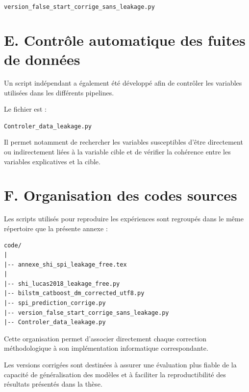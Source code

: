 \documentclass[12pt, a4paper, oneside, french]{report}
\begin{document}
\begin{center}
\texttt{version\_false\_start\_corrige\_sans\_leakage.py}
\end{center}




\section*{E. Contrôle automatique des fuites de données}

Un script indépendant a également été développé afin de contrôler les
variables utilisées dans les différents pipelines.

Le fichier est :

\begin{center}
\texttt{Controler\_data\_leakage.py}
\end{center}

Il permet notamment de rechercher les variables susceptibles d'être
directement ou indirectement liées à la variable cible et de vérifier la
cohérence entre les variables explicatives et la cible.




\section*{F. Organisation des codes sources}

Les scripts utilisés pour reproduire les expériences sont regroupés dans le
même répertoire que la présente annexe :

\begin{verbatim}
code/
|
|-- annexe_shi_spi_leakage_free.tex
|
|-- shi_lucas2018_leakage_free.py
|-- bilstm_catboost_dm_corrected_utf8.py
|-- spi_prediction_corrige.py
|-- version_false_start_corrige_sans_leakage.py
|-- Controler_data_leakage.py
\end{verbatim}

Cette organisation permet d'associer directement chaque correction
méthodologique à son implémentation informatique correspondante.

Les versions corrigées sont destinées à assurer une évaluation plus fiable
de la capacité de généralisation des modèles et à faciliter la reproductibilité
des résultats présentés dans la thèse.
\end{document}
